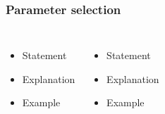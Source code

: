 \begin{frame}
	\frametitle{Parameter selection}
	
	\begin{columns}[c]
		
		
		\begin{itemize}
			\item Statement
			\item Explanation
			\item Example
		\end{itemize}
		
		
		\begin{itemize}
			\item Statement
			\item Explanation
			\item Example
		\end{itemize}	
		
	\end{columns}
	
\end{frame}